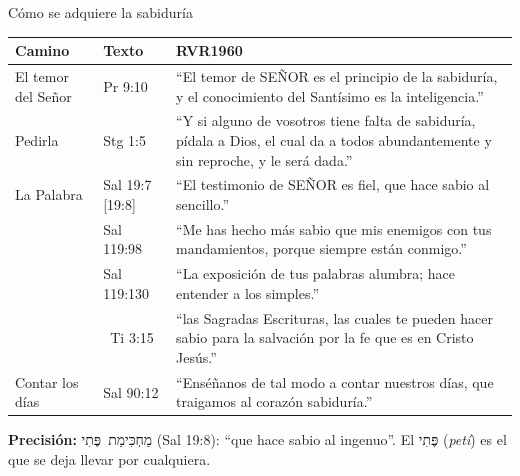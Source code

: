 \documentclass[hyperref={bookmarks=false},aspectratio=169]{beamer}
\newcommand{\heb}[1]{\mbox{\foreignlanguage{hebrew}{#1}}}
\newcommand{\SENOR}{S{\fontsize{0.78em}{1em}\selectfont EÑOR}}
\newcommand{\precision}[1]{{\footnotesize\color{gris}\textbf{Precisión:} #1}}
\begin{document}
\begin{frame}{Cómo se adquiere la sabiduría}
\scriptsize\renewcommand{\arraystretch}{1.18}
\begin{tabular}{@{}>{\RaggedRight\arraybackslash}p{2.4cm}>{\RaggedRight\arraybackslash}p{1.9cm}>{\RaggedRight\arraybackslash}p{7.5cm}@{}}
\toprule
\textbf{Camino} & \textbf{Texto} & \textbf{RVR1960} \\ \midrule
El temor del Señor & Pr 9:10 & ``El temor de \SENOR{} es el principio de la sabiduría, y el conocimiento del Santísimo es la inteligencia.'' \\
Pedirla & Stg 1:5 & ``Y si alguno de vosotros tiene falta de sabiduría, pídala a Dios, el cual da a todos abundantemente y sin reproche, y le será dada.'' \\
La Palabra & Sal 19:7 [19:8] & ``El testimonio de \SENOR{} es fiel, que hace sabio al sencillo.'' \\
 & Sal 119:98 & ``Me has hecho más sabio que mis enemigos con tus mandamientos, porque siempre están conmigo.'' \\
 & Sal 119:130 & ``La exposición de tus palabras alumbra; hace entender a los simples.'' \\
 & 2~Ti 3:15 & ``las Sagradas Escrituras, las cuales te pueden hacer sabio para la salvación por la fe que es en Cristo Jesús.'' \\
Contar los días & Sal 90:12 & ``Enséñanos de tal modo a contar nuestros días, que traigamos al corazón sabiduría.'' \\
\bottomrule
\end{tabular}\par\smallskip
\precision{\heb{מַחְכִּימַת פֶּתִי} (Sal 19:8): ``que hace sabio al ingenuo''. El \heb{פֶּתִי} (\emph{petí}) es el que se deja llevar por cualquiera.}
\end{frame}
\end{document}

